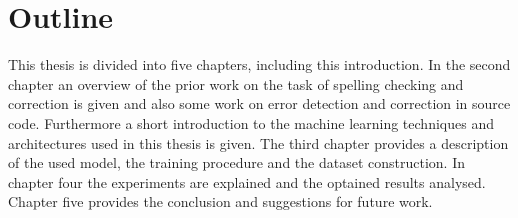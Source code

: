 \section{Outline}

This thesis is divided into five chapters, including this introduction. In the second chapter an overview of the prior work on the task of spelling checking and correction is given and also some work on error detection and correction in source code. Furthermore a short introduction to the machine learning techniques and architectures used in this thesis is given. The third chapter provides a description of the used model, the training procedure and the dataset construction. In chapter four the experiments are explained and the optained results analysed. Chapter five provides the conclusion and suggestions for future work.
